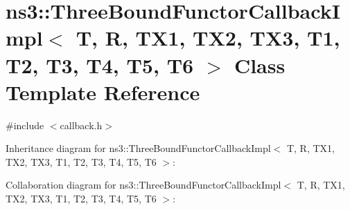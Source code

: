 \hypertarget{classns3_1_1ThreeBoundFunctorCallbackImpl}{}\section{ns3\+:\+:Three\+Bound\+Functor\+Callback\+Impl$<$ T, R, T\+X1, T\+X2, T\+X3, T1, T2, T3, T4, T5, T6 $>$ Class Template Reference}
\label{classns3_1_1ThreeBoundFunctorCallbackImpl}


{\ttfamily \#include $<$callback.\+h$>$}



Inheritance diagram for ns3\+:\+:Three\+Bound\+Functor\+Callback\+Impl$<$ T, R, T\+X1, T\+X2, T\+X3, T1, T2, T3, T4, T5, T6 $>$\+:


Collaboration diagram for ns3\+:\+:Three\+Bound\+Functor\+Callback\+Impl$<$ T, R, T\+X1, T\+X2, T\+X3, T1, T2, T3, T4, T5, T6 $>$\+:
